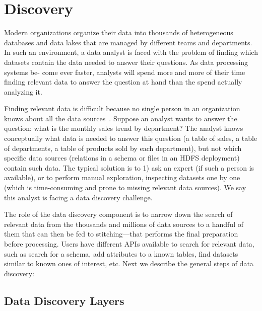 \section{Discovery}
\label{sec:discovery}


Modern organizations organize their data into thousands of heterogeneous
databases and data lakes that are managed by different teams and departments. In
such an environment, a data analyst is faced with the problem of finding which
datasets contain the data needed to answer their questions. As data processing
systems be- come ever faster, analysts will spend more and more of their time
finding relevant data to answer the question at hand than the spend actually
analyzing it.

Finding relevant data is difficult because no single person in an organization
knows about all the data sources~\cite{XXX}. Suppose an analyst wants to answer the
question: what is the monthly sales trend by department? The analyst knows
conceptually what data is needed to answer this question (a table of sales, a
table of departments, a table of products sold by each department), but not
which specific data sources (relations in a schema or files in an HDFS
deployment) contain such data. The typical solution is to 1) ask an expert (if
such a person is available), or to perform manual exploration, inspecting
datasets one by one (which is time-consuming and prone to missing relevant data
sources). We say this analyst is facing a data discovery challenge.

The role of the data discovery component is to narrow down the search of
relevant data from the thousands and millions of data sources to a handful of
them that can then be fed to stitching---that performs the final preparation
before processing. Users have different APIs available to search for relevant
data, such as search for a schema, add attributes to a known tables, find
datasets similar to known ones of interest, etc. Next we describe the general
steps of data discovery:

\subsection{Data Discovery Layers}

